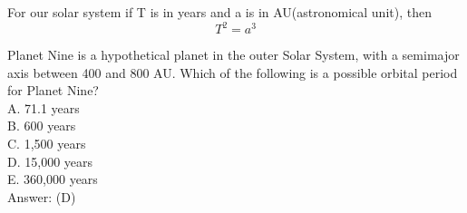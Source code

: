 \documentclass{article}
\begin{document}
\noindent
For our solar system if T is in years and a is in AU(astronomical unit), then
$$T^2 = a^3$$
\begin{tcolorbox}[breakable,colback=green!5!white, colframe=green!75!black, title={Problem}]
Planet Nine is a hypothetical planet in the
outer Solar System, with a semimajor axis between 400 and 800 AU. Which of the following
is a possible orbital period for Planet Nine?
\\
A. 71.1 years
\\
B. 600 years
\\
C. 1,500 years
\\
D. 15,000 years
\\
E. 360,000 years
\\
Answer: (D)
\end{tcolorbox}
\end{document}
